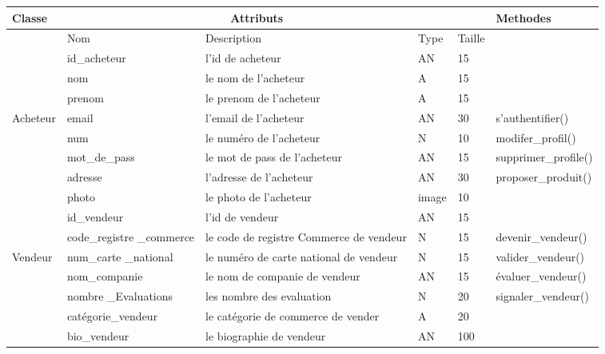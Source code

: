 \documentclass[edit,12pt,a4paper,ChapStyle,oneside,doubleinterligne]{report}
\begin{document}
\begin{table}[H]
    \centering
    \begin{tabular}{ | m{} | m{}| m{3cm} |m{}|m{}|l|}
    \hline
         Classe&\multicolumn{3}{c}{Attributs}&\phantom{h} &Methodes\\
         \hline &Nom&Description&Type&Taille&\\\cline{2-5}
                                        &id\_acheteur&l'id de acheteur&AN&15& \\\cline{2-5}
                                        &nom         &le nom de l'acheteur&A&15& \\\cline{2-5}
                                        &prenom      &le prenom de l'acheteur&A&15& \\\cline{2-5}
                                Acheteur&email       &l'email de l'acheteur&AN&30&s'authentifier() \\\cline{2-5}
                                        &num         &le numéro de l'acheteur&N&10&modifer\_profil() \\\cline{2-5}
                                        &mot\_de\_pass&le mot de pass de l'acheteur&AN&15& supprimer\_profile()\\\cline{2-5}
                                        &adresse     &l'adresse de l'acheteur&AN&30&proposer\_produit()\\\cline{2-5}
                                        &photo       &le photo de l'acheteur&image&10&\\\hline


                                        &id\_vendeur &l'id de vendeur&AN&15& \\\cline{2-5}
                                        &code\_registre \_commerce&le code de registre Commerce de vendeur&N&15&devenir\_vendeur() \\\cline{2-5}
                                Vendeur &num\_carte \_national&le numéro de carte national de vendeur&N&15&valider\_vendeur()\\\cline{2-5}
                                        &nom\_companie &le nom de companie de vendeur&AN&15&évaluer\_vendeur()\\\cline{2-5}
                                        &nombre \_Evaluations&les nombre des evaluation&N&20&signaler\_vendeur()\\\cline{2-5}
                                        &catégorie\_vendeur&le catégorie de commerce de vender&A&20& \\\cline{2-5}
                                        &bio\_vendeur&le biographie de vendeur&AN&100& \\\hline


\end{tabular}
\end{table}
\end{document}
